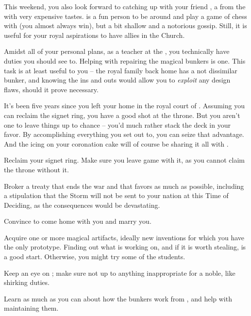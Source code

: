 \documentclass[char]{GL2020}
\begin{document}
This weekend, you also look forward to catching up with your friend \cHedonist{\full}, a \cHedonist{\cleric} from the \pFarm{} with very expensive tastes. \cHedonist{} is a fun person to be around and play a game of chess with (you almost always win), but a bit shallow and a notorious gossip. Still, it is useful for your royal aspirations to have allies in the Church.

Amidst all of your personal plans, as a teacher at the \pSc{}, you technically have duties you should see to. Helping \cBunker{\full} with repairing the magical bunkers is one. This task is at least useful to you -- the royal family back home has a not dissimilar bunker, and knowing the ins and outs would allow you to \emph{exploit} any design flaws, should it prove necessary. 

It's been five years since you left your home in the royal court of \pFarm{}. Assuming you can reclaim the signet ring, you have a good shot at the throne. But you aren't one to leave things up to chance -- you'd much rather stack the deck in your favor. By accomplishing everything you set out to, you can seize that advantage. And the icing on your coronation cake will of course be sharing it all with \cPirate{}.

\begin{itemz}
	\item Reclaim your signet ring. Make sure you leave game with it, as you cannot claim the \pFarm{} throne without it.
\item Broker a treaty that ends the war and that favors \pFarm{} as much as possible, including a stipulation that the Storm will not be sent to your nation at this Time of Deciding, as the consequences would be devastating.
\item Convince \cPirate{} to come home with you and marry you.
\item Acquire one or more magical artifacts, ideally new inventions for which you have the only prototype. Finding out what \cCurse{} is working on, and if it is worth stealing, is a good start. Otherwise, you might try some of the \pTech{} students.
	\item Keep an eye on \cAdopted{}; make sure \cAdopted{\they} \cAdopted{\are} not up to anything inappropriate for a noble, like shirking \cAdopted{\their} duties.
\item Learn as much as you can about how the bunkers work from \cBunker{}, and help with maintaining them. 
\end{itemz}
\end{document}
